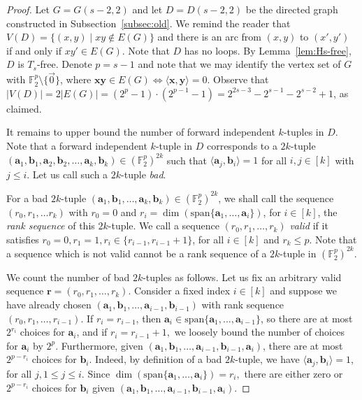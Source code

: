 \documentclass{article}
\theoremstyle{plain}
\theoremstyle{definition}
\newcommand{\ba}{\mathbf{a}}
\newcommand{\bb}{\mathbf{b}}
\newcommand{\br}{\mathbf{r}}
\newcommand{\bx}{\mathbf{x}}
\newcommand{\by}{\mathbf{y}}
\begin{document}
\begin{proof}
    Let $G = G(s-2, 2)$ and let $D = D(s-2, 2)$ be the directed graph constructed in Subsection~\ref{subsec:old}. We remind the reader that $V(D) = \{ (x, y) \mid xy \not\in E(G) \}$ and there is an arc from $(x, y)$ to $(x', y')$ if and only if $xy' \in E(G)$. Note that $D$ has no loops. By Lemma~\ref{lem:Hs-free}, $D$ is $T_s$-free. Denote $p = s-1$ and note that we may identify the vertex set of $G$ with $\mathbb{F}_2^p \setminus \{ \overrightarrow{0} \}$, where $\bx \by \in E(G) \iff \langle \bx, \by \rangle = 0.$ Observe that $|V(D)| = 2 |E(G)| = (2^p - 1) \cdot (2^{p-1} - 1) = 2^{2s-3} - 2^{s-1} - 2^{s-2} + 1$, as claimed.
    
    It remains to upper bound the number of forward independent $k$-tuples in $D$. Note that a forward independent $k$-tuple in $D$ corresponds to a $2k$-tuple $(\ba_1, \bb_1, \ba_2, \bb_2, \dots, \ba_k, \bb_k) \in (\mathbb{F}_2^p)^{2k}$ such that $\langle \ba_j, \bb_i \rangle = 1$ for all $i,j \in [k]$ with $j \le i.$ Let us call such a $2k$-tuple \emph{bad}.

    For a bad $2k$-tuple $(\ba_1, \bb_1, \dots, \ba_k, \bb_k) \in (\mathbb{F}_2^p)^{2k}$, we shall call the sequence $(r_0, r_1, \dots r_k)$ with $r_0 = 0$ and $r_i = \dim( \mathrm{span} \{ \ba_1, \dots, \ba_i \})$, for $i \in [k]$, the \emph{rank sequence} of this $2k$-tuple. We call a sequence $(r_0, r_1, \dots, r_k)$ \emph{valid} if it satisfies $r_0 = 0, r_1 = 1, r_i \in \{r_{i-1}, r_{i-1} + 1\}$, for all $i \in [k]$ and $r_k \le p$. Note that a sequence which is not valid cannot be a rank sequence of a $2k$-tuple in $(\mathbb{F}_2^p)^{2k}$.
    
    We count the number of bad $2k$-tuples as follows. Let us fix an arbitrary valid sequence $\br = (r_0, r_1, \dots, r_k)$. Consider a fixed index $i \in [k]$ and suppose we have already chosen $(\ba_1, \bb_1, \dots, \ba_{i-1}, \bb_{i-1})$ with rank sequence $(r_0, r_1, \dots, r_{i-1})$. If $r_i = r_{i-1}$, then $\ba_i \in \mathrm{span} \{ \ba_1, \dots, \ba_{i-1} \}$, so there are at most $2^{r_i}$ choices for $\ba_i$, and if $r_i = r_{i-1} + 1,$ we loosely bound the number of choices for $\ba_i$ by $2^p$. Furthermore, given $(\ba_1, \bb_1, \dots, \ba_{i-1}, \bb_{i-1}, \ba_i)$, there are at most $2^{p - r_i}$ choices for $\bb_i$. Indeed, by definition of a bad $2k$-tuple, we have $\langle \ba_j, \bb_i \rangle = 1$, for all $j, 1 \le j\le i$. Since $\dim (\mathrm{span} \{\ba_1, \dots, \ba_i \}) = r_i,$ there are either zero or $2^{p - r_i}$ choices for $\bb_i$ given $(\ba_1, \bb_1, \dots, \ba_{i-1}, \bb_{i-1}, \ba_i)$.


\end{proof}
\end{document}
